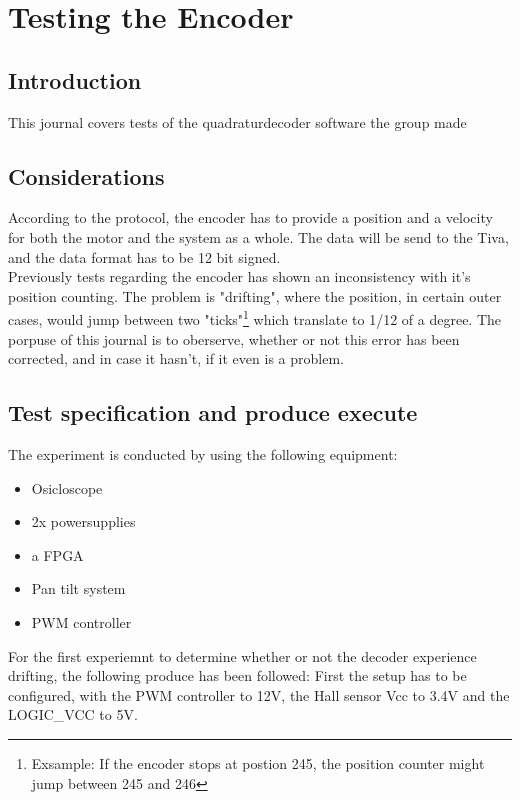 \documentclass[../main]{subfiles}
\begin{document}
\section*{Testing the Encoder}

\subsection*{Introduction}

This journal covers tests of the quadraturdecoder software the group made
\subsection*{Considerations}

According to the protocol, the encoder has to provide a position and a velocity for both the motor and the system as a whole. The data will be send to the Tiva, and the data format has to be 12 bit signed.
\\
Previously tests regarding the encoder  has shown an inconsistency with it's position counting. The problem is  "drifting", where the position, in certain outer cases, would jump between two "ticks"\footnote{Exsample: If the encoder stops at postion 245, the position counter might jump between 245 and 246} which translate to 1/12 of a degree. The porpuse of this journal is to oberserve, whether or not this error has been corrected, and in case it hasn't, if it even is a problem.

\subsection*{Test specification and produce execute}
The experiment is conducted by using the following equipment:

\begin{itemize}
  \item Osicloscope
  \item 2x powersupplies
  \item a FPGA
  \item Pan tilt system
  \item PWM controller
\end{itemize}

For the first experiemnt to determine whether or not the decoder experience drifting, the following produce has been followed:
First the setup has to be configured, with the PWM controller to 12V, the Hall sensor Vcc to 3.4V and the LOGIC\_VCC to 5V.
\end{document}
